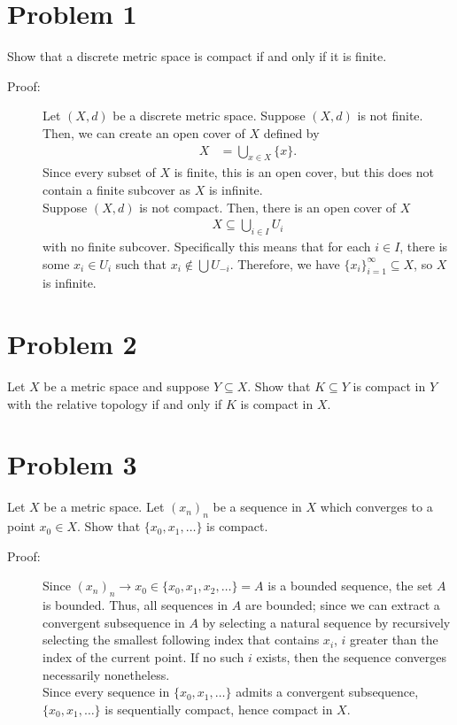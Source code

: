 \documentclass[10pt]{extarticle}
\title{}
\author{}
\date{}
\begin{document}
  \section{Problem 1}%
  Show that a discrete metric space is compact if and only if it is finite.
  \begin{description}
    \item[Proof:] Let $(X,d)$ be a discrete metric space. Suppose $(X,d)$ is not finite. Then, we can create an open cover of $X$ defined by
      \begin{align*}
        X &= \bigcup_{x\in X}\{x\}.
      \end{align*}
      Since every subset of $X$ is finite, this is an open cover, but this does not contain a finite subcover as $X$ is infinite.\\

      Suppose $(X,d)$ is not compact. Then, there is an open cover of $X$
      \begin{align*}
        X \subseteq \bigcup_{i\in I} U_i
      \end{align*}
      with no finite subcover. Specifically this means that for each $i\in I$, there is some $x_{i}\in U_i$ such that $x_{i}\notin \bigcup U_{-i}$. Therefore, we have $\{x_i\}_{i=1}^{\infty}\subseteq X$, so $X$ is infinite.
  \end{description}
  \section{Problem 2}%
  Let $X$ be a metric space and suppose $Y\subseteq X$. Show that $K\subseteq Y$ is compact in $Y$ with the relative topology if and only if $K$ is compact in $X$.
  \section{Problem 3}%
  Let $X$ be a metric space. Let $(x_n)_n$ be a sequence in $X$ which converges to a point $x_0\in X$. Show that $\{x_0,x_1,\dots\}$ is compact.
  \begin{description}
    \item[Proof:] Since $(x_n)_n\rightarrow x_0\in \{x_0,x_1,x_2,\dots\} = A$ is a bounded sequence, the set $A$ is bounded. Thus, all sequences in $A$ are bounded; since we can extract a convergent subsequence in $A$ by selecting a natural sequence by recursively selecting the smallest following index that contains $x_{i}$, $i$ greater than the index of the current point. If no such $i$ exists, then the sequence converges necessarily nonetheless.\\

      Since every sequence in $\{x_0,x_1,\dots\}$ admits a convergent subsequence, $\{x_0,x_1,\dots\}$ is sequentially compact, hence compact in $X$.
  \end{description}
\end{document}
